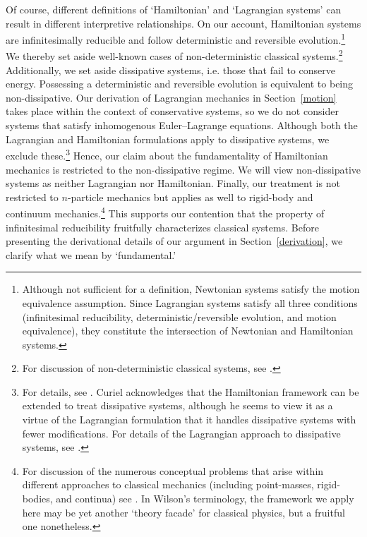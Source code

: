 \documentclass[12pt, english, twoside]{article} %
\begin{document}
Of course, different definitions of `Hamiltonian' and `Lagrangian systems' can result in different interpretive relationships. On our account, Hamiltonian systems are infinitesimally reducible and follow deterministic and reversible evolution.\footnote{Although not sufficient for a definition, Newtonian systems satisfy the motion equivalence assumption. Since Lagrangian systems satisfy all three conditions (infinitesimal reducibility, deterministic/reversible evolution, and motion equivalence), they constitute the intersection of Newtonian and Hamiltonian systems.} We thereby set aside well-known cases of non-deterministic classical systems.\footnote{For discussion of non-deterministic classical systems, see \textcites*[3-4]{Baez}{Earman}{Norton}.} Additionally, we set aside dissipative systems, i.e. those that fail to conserve energy. Possessing a deterministic and reversible evolution is equivalent to being non-dissipative. Our derivation of Lagrangian mechanics in Section~\ref{motion} takes place within the context of conservative systems, so we do not consider systems that satisfy inhomogenous Euler--Lagrange equations. Although both the Lagrangian and Hamiltonian formulations apply to dissipative systems, we exclude these.\footnote{For details, see \textcites[\S 10.4]{Cline}. Curiel \parencites*[311]{Curiel} acknowledges that the Hamiltonian framework can be extended to treat dissipative systems, although he seems to view it as a virtue of the Lagrangian formulation that it handles dissipative systems with fewer modifications. For details of the Lagrangian approach to dissipative systems, see \textcites[]{Smith}.} Hence, our claim about the fundamentality of Hamiltonian mechanics is restricted to the non-dissipative regime. We will view non-dissipative systems as neither Lagrangian nor Hamiltonian. Finally, our treatment is not restricted to $n$-particle mechanics but applies as well to rigid-body and continuum mechanics.\footnote{For discussion of the numerous conceptual problems that arise within different approaches to classical mechanics (including point-masses, rigid-bodies, and continua) see \textcites{Wilson}. In Wilson's terminology, the framework we apply here may be yet another `theory facade' for classical physics, but a fruitful one nonetheless.} This supports our contention that the property of infinitesimal reducibility fruitfully characterizes classical systems. Before presenting the derivational details of our argument in Section~\ref{derivation}, we clarify what we mean by `fundamental.'
\end{document}
